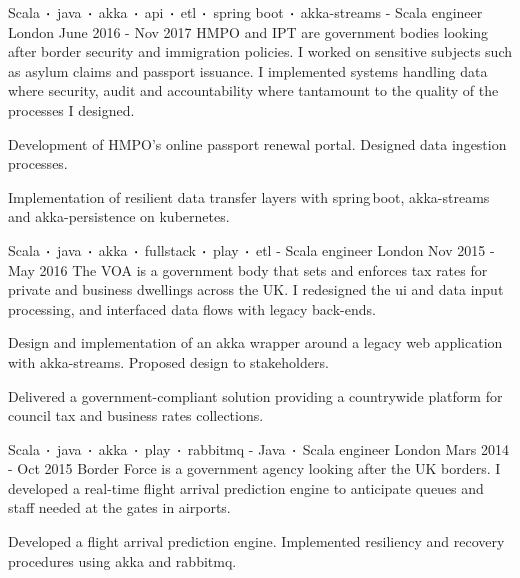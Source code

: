 \begin{cventries}
    \cventry
    {Scala$\sqbig$java$\sqbig$akka$\sqbig$api$\sqbig$etl$\sqbig$spring boot$\sqbig$akka-streams}
    { - Scala engineer}
    {London}
    {June 2016 - Nov 2017}
    {HMPO and IPT are government bodies looking after border security and immigration policies. I worked on sensitive subjects such as asylum claims and passport issuance. I implemented systems handling data where security, audit and accountability where tantamount to the quality of the processes I designed.}
    {
        \begin{cvitems}
            \item{Development of HMPO's online passport renewal portal. Designed data ingestion processes.}
            \item{Implementation of resilient data transfer layers with spring\,boot, akka-streams and akka-persistence on kubernetes.}
        \end{cvitems}
    }

    \cventry
    {Scala$\sqbig$java$\sqbig$akka$\sqbig$fullstack$\sqbig$play$\sqbig$etl}
    { - Scala engineer}
    {London}
    {Nov 2015 - May 2016}
    {The VOA is a government body that sets and enforces tax rates for private and business dwellings across the UK. I redesigned the ui and data input processing, and interfaced data flows with legacy back-ends. }
    {
        \begin{cvitems}
            \item{Design and implementation of an akka wrapper around a legacy web application with akka-streams. Proposed design to stakeholders.}
            \item{Delivered a government-compliant solution providing a countrywide platform for council tax and business rates collections.}
        \end{cvitems}
    }

    \cventry
    {Scala$\sqbig$java$\sqbig$akka$\sqbig$play$\sqbig$rabbitmq}
    { - Java$\sqbig$Scala engineer}
    {London}
    {Mars 2014 - Oct 2015}
    {Border Force is a government agency looking after the UK borders. I developed a real-time flight arrival prediction engine to anticipate queues and staff needed at the gates in airports.}
    {
        \begin{cvitems}
            \item{Developed a flight arrival prediction engine. Implemented resiliency and recovery procedures using akka and rabbitmq.}
        \end{cvitems}
    }


\end{cventries}
